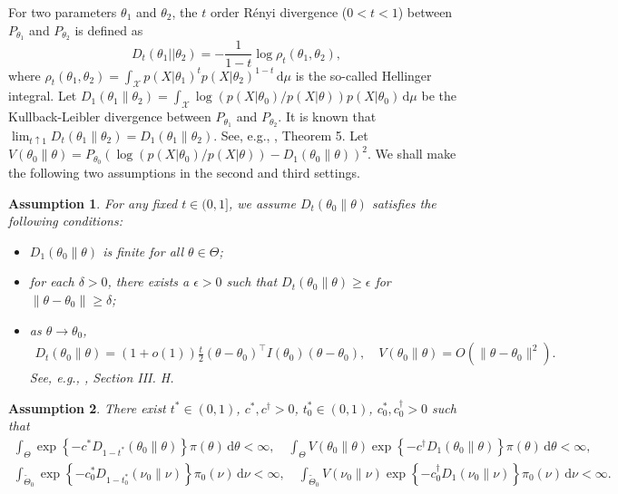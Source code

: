 \documentclass[11pt]{article}
\theoremstyle{plain}
\newtheorem{assumption}{\quad\quad Assumption}
\theoremstyle{definition}
\theoremstyle{remark}
\begin{document}
 For two parameters $\theta_1$ and $\theta_2$, the $t$ order R\'{e}nyi divergence ($0<t <1$) between $P_{\theta_1}$ and $P_{\theta_2}$ is defined as
$$
D_{t}(\theta_1||\theta_2)=-\frac{1}{1-t}\log \rho_{t}(\theta_1,\theta_2),
$$
where
$
\rho_{t}(\theta_1,\theta_2)=\int_{\mathcal{X}} p(X|\theta_1)^{t} p(X|\theta_2)^{1-t} \, \mathrm d \mu
$ is the so-called Hellinger integral.
Let $D_1(\theta_1 \| \theta_2) = \int_{\mathcal X} \log \left( p(X | \theta_0) / p( X | \theta) \right) p(X |\theta_0) \, \mathrm d \mu$ be the Kullback-Leibler divergence between $P_{\theta_1}$ and $P_{\theta_2}$.
It is known that $\lim_{t \uparrow 1} D_t(\theta_1 \| \theta_2) = D_1 (\theta_1 \| \theta_2)$. 
See, e.g., \cite{Erven2014}, Theorem 5.
Let 
 $V(\theta_0 \| \theta) = P_{\theta_0} \left( \log \left( p(X|\theta_0) / p(X | \theta) \right) - D_1 (\theta_0 \| \theta) \right)^2$.
We shall make the following two assumptions in the second and third settings.
\begin{assumption}
    For any fixed $t \in (0,1]$,
    we assume $D_t\left( \theta_0 \| \theta \right)$ satisfies the following conditions:
    \begin{itemize}
        \item 
    $D_1(\theta_0 \| \theta)$ is finite for all $\theta \in \Theta$;
\item
    for each $\delta >0$,
    there exists a $\epsilon>0$ such that $D_t\left( \theta_0 \| \theta \right)\geq \epsilon$ for $\|\theta-\theta_0\| \geq \delta$;
\item
    as $\theta \to \theta_0$, 
    \begin{align*}
        D_t(\theta_0 \| \theta) = (1+o(1))\frac{t}{2} (\theta -\theta_0)^\top I(\theta_0) (\theta - \theta_0),\quad
        V(\theta_0 \| \theta ) = O\left( \|\theta - \theta_0\|^2 \right)
        .
    \end{align*}
    See, e.g., \cite{Erven2014}, Section III. H.
    \end{itemize}
    \label{assumption2019}
\end{assumption}
\begin{assumption}
    There exist $t^* \in (0,1)$, $c^*, c^\dagger > 0$, $t_0^* \in (0,1)$, $c_0^*, c_0^\dagger > 0$ such that
    \begin{align*}
        \int_{\Theta} \exp\left\{ -c^* D_{1-t^*}(\theta_0 \| \theta) \right\} \pi (\theta) \, \mathrm d \theta < \infty,
        \quad
        \int_{\Theta} V(\theta_0 \|\theta) \exp\left\{ -c^\dagger D_{1}(\theta_0 \| \theta) \right\} \pi (\theta) \, \mathrm d \theta < \infty,
    \end{align*}
    \begin{align*}
        \int_{\tilde{\Theta}_0} \exp\left\{ -c_0^* D_{1-t_0^*}(\nu_0 \| \nu) \right\} \pi_0 (\nu) \, \mathrm d \nu < \infty,
        \quad
        \int_{\tilde \Theta_0} V(\nu_0 \|\nu) \exp\left\{ - c_0^\dagger D_{1}(\nu_0 \| \nu) \right\} \pi_0 (\nu) \, \mathrm d \nu < \infty.
    \end{align*}
    \label{assumption:prior}
\end{assumption}
\end{document}
